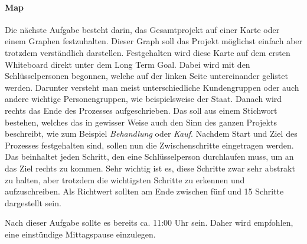 \paragraph{Map}
Die nächste Aufgabe besteht darin, das Gesamtprojekt auf einer Karte oder einem Graphen festzuhalten. Dieser Graph soll das Projekt möglichst einfach aber trotzdem verständlich darstellen. Festgehalten wird diese Karte auf dem ersten Whiteboard direkt unter dem Long Term Goal. Dabei wird mit den Schlüsselpersonen begonnen, welche auf der linken Seite untereinander gelistet werden. Darunter versteht man meist unterschiedliche Kundengruppen oder auch andere wichtige Personengruppen, wie beispielsweise der Staat. Danach wird rechts das Ende des Prozesses aufgeschrieben. Das soll aus einem Stichwort bestehen, welches das in gewisser Weise auch den Sinn des ganzen Projekts beschreibt, wie zum Beispiel \textit{Behandlung} oder \textit{Kauf}. Nachdem Start und Ziel des Prozesses festgehalten sind, sollen nun die Zwischenschritte eingetragen werden. Das beinhaltet jeden Schritt, den eine Schlüsselperson durchlaufen muss, um an das Ziel rechts zu kommen. Sehr wichtig ist es, diese Schritte zwar sehr abstrakt zu halten, aber trotzdem die wichtigsten Schritte zu erkennen und aufzuschreiben. Als Richtwert sollten am Ende zwischen fünf und 15 Schritte dargestellt sein.

Nach dieser Aufgabe sollte es bereits ca. 11:00 Uhr sein. Daher wird empfohlen, eine einstündige Mittagspause einzulegen.

